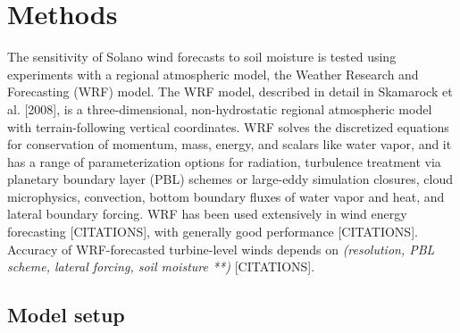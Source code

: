 
%
%
%
%
%

\section{Methods}

The sensitivity of Solano wind forecasts to soil moisture is tested using experiments with a regional atmospheric model, the Weather Research and Forecasting (WRF) model.  The WRF model, described in detail in Skamarock et al. [2008], is a three-dimensional, non-hydrostatic regional atmospheric model with terrain-following vertical coordinates.  WRF solves the discretized equations for conservation of momentum, mass, energy, and scalars like water vapor, and it has a range of parameterization options for radiation, turbulence treatment via planetary boundary layer (PBL) schemes or large-eddy simulation closures, cloud microphysics, convection, bottom boundary fluxes of water vapor and heat, and lateral boundary forcing.  WRF has been used extensively in wind energy forecasting [CITATIONS], with generally good performance [CITATIONS].  Accuracy of WRF-forecasted turbine-level winds depends on \textit{(resolution, PBL scheme, lateral forcing, soil moisture **)} [CITATIONS].

\subsection{Model setup}

